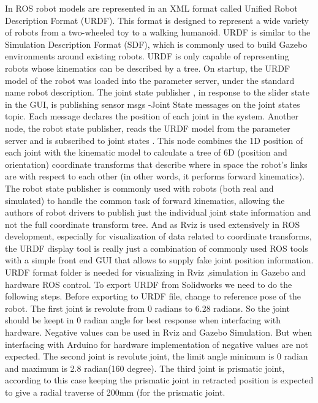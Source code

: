 \documentclass[a4paper,12pt,one side]{report}%
\begin{document}
In ROS robot models are represented in an XML format called Unified Robot Description Format (URDF). This format is designed to represent a wide variety of robots from a two-wheeled toy to a walking humanoid. URDF is similar to the Simulation Description Format (SDF), which is commonly used to build Gazebo environments around existing robots. URDF is only capable of representing robots whose kinematics can be described by a tree.
\newline
On startup, the URDF model of the robot was loaded into the parameter server, under the standard name robot description.
The joint state publisher , in response to the slider state in the GUI, is publishing sensor msgs -Joint State messages on the joint states topic. Each message declares the position of each joint in the system. Another node, the robot state publisher, reads the URDF model from the parameter server and is subscribed to joint states . This node combines the 1D position of each joint with the kinematic model to calculate a tree of 6D (position and orientation) coordinate transforms that describe where in space the robot’s links are with respect to each other (in other words, it performs forward kinematics).
\newline
The robot state publisher is commonly used with robots (both real and simulated) to handle the common task of forward kinematics, allowing the authors of robot drivers to publish just the individual joint state information and not the full coordinate transform tree. And as Rviz
is used extensively in ROS development, especially for visualization of data related to coordinate transforms, the URDF display tool is really just a combination of commonly used ROS tools with a simple front end GUI that allows to  supply fake
joint position information.
\newline
URDF format folder is needed for visualizing in Rviz ,simulation in Gazebo and hardware ROS control. To export URDF from Solidworks we need to do the following steps.
\newline
Before exporting to URDF file, change to reference pose of the robot. The first joint is revolute from 0 radians to 6.28 radians. So the joint should be keept in 0 radian angle for best response when interfacing with hardware. Negative values can be used in Rviz and Gazebo Simulation. But when interfacing with Arduino for hardware implementation of negative values are not expected. 
The second joint is revolute joint, the limit angle minimum is 0 radian and maximum is 2.8 radian(160 degree). 
The third joint is prismatic joint, according to this case keeping the prismatic joint in retracted position is expected to give a radial traverse of 200mm (for the prismatic joint. \newline
\end{document}
